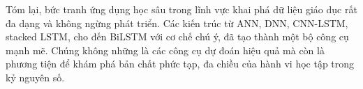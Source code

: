 Tóm lại, bức tranh ứng dụng học sâu trong lĩnh vực khai phá dữ liệu giáo dục rất đa dạng và không ngừng phát triển. Các kiến trúc từ ANN, DNN, CNN-LSTM, stacked LSTM, cho đến BiLSTM với cơ chế chú ý, đã tạo thành một bộ công cụ mạnh mẽ. Chúng không những là các công cụ dự đoán hiệu quả mà còn là phương tiện để khám phá bản chất phức tạp, đa chiều của hành vi học tập trong kỷ nguyên số.





